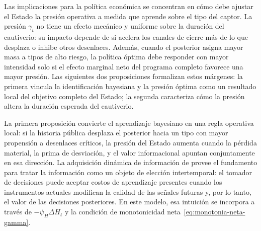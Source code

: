\documentclass[review,authoryear,12pt]{elsarticle}
\theoremstyle{plain}
\theoremstyle{definition}
\newcommand{\1}{\mathbf{1}}
\begin{document}
\noindent Las implicaciones para la política económica se concentran en cómo debe ajustar el Estado la presión operativa a medida que aprende sobre el tipo del captor. La presión $\gamma_t$ no tiene un efecto mecánico y uniforme sobre la duración del cautiverio: su impacto depende de si acelera los canales de cierre más de lo que desplaza o inhibe otros desenlaces. Además, cuando el posterior asigna mayor masa a tipos de alto riesgo, la política óptima debe responder con mayor intensidad solo si el efecto marginal neto del programa completo favorece una mayor presión. Las siguientes dos proposiciones formalizan estos márgenes: la primera vincula la identificación bayesiana y la presión óptima como un resultado local del objetivo completo del Estado; la segunda caracteriza cómo la presión altera la duración esperada del cautiverio.

\noindent La primera proposición convierte el aprendizaje bayesiano en una regla operativa local: si la historia pública desplaza el posterior hacia un tipo con mayor propensión a desenlaces críticos, la presión del Estado aumenta cuando la pérdida material, la prima de desviación, y el valor informacional apuntan conjuntamente en esa dirección. La adquisición dinámica de información de \citet{Zhong2022} provee el fundamento para tratar la información como un objeto de elección intertemporal: el tomador de decisiones puede aceptar costos de aprendizaje presentes cuando los instrumentos actuales modifican la calidad de las señales futuras y, por lo tanto, el valor de las decisiones posteriores. En este modelo, esa intuición se incorpora a través de $-\psi_H\Delta H_t$ y la condición de monotonicidad neta~\eqref{eq:monotonia-neta-gamma}.
\end{document}
